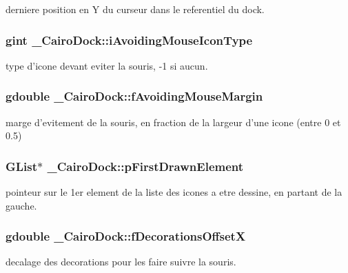 derniere position en Y du curseur dans le referentiel du dock. 

\subsubsection{\setlength{\rightskip}{0pt plus 5cm}gint {\bf \_\-CairoDock::iAvoidingMouseIconType}}\label{struct__CairoDock_5438b1a8cd1df4d6f3eaaf50fcd9463f}


type d'icone devant eviter la souris, -1 si aucun. 

\subsubsection{\setlength{\rightskip}{0pt plus 5cm}gdouble {\bf \_\-CairoDock::fAvoidingMouseMargin}}\label{struct__CairoDock_90dc53417eda7f4b4fd7eb770e4be693}


marge d'evitement de la souris, en fraction de la largeur d'une icone (entre 0 et 0.5) 

\subsubsection{\setlength{\rightskip}{0pt plus 5cm}GList$\ast$ {\bf \_\-CairoDock::pFirstDrawnElement}}\label{struct__CairoDock_6765b88fb98c987436d90f64867f67cf}


pointeur sur le 1er element de la liste des icones a etre dessine, en partant de la gauche. 

\subsubsection{\setlength{\rightskip}{0pt plus 5cm}gdouble {\bf \_\-CairoDock::fDecorationsOffsetX}}\label{struct__CairoDock_9e0bac6ce7af6108cff1bb7dd75115c9}


decalage des decorations pour les faire suivre la souris. 

